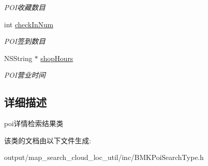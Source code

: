 \begin{DoxyCompactItemize}
\begin{DoxyCompactList}\small\item\em P\+O\+I收藏数目 \end{DoxyCompactList}\item 
\hypertarget{interface_b_m_k_poi_detail_result_aeb7c140cbab374cb4a1171d9b0110e47}{int \hyperlink{interface_b_m_k_poi_detail_result_aeb7c140cbab374cb4a1171d9b0110e47}{check\+In\+Num}}\label{interface_b_m_k_poi_detail_result_aeb7c140cbab374cb4a1171d9b0110e47}

\begin{DoxyCompactList}\small\item\em P\+O\+I签到数目 \end{DoxyCompactList}\item 
\hypertarget{interface_b_m_k_poi_detail_result_abc1d7ae185ffba432cf72148c9a896dd}{N\+S\+String $\ast$ \hyperlink{interface_b_m_k_poi_detail_result_abc1d7ae185ffba432cf72148c9a896dd}{shop\+Hours}}\label{interface_b_m_k_poi_detail_result_abc1d7ae185ffba432cf72148c9a896dd}

\begin{DoxyCompactList}\small\item\em P\+O\+I营业时间 \end{DoxyCompactList}\end{DoxyCompactItemize}


\subsection{详细描述}
poi详情检索结果类 

该类的文档由以下文件生成\+:\begin{DoxyCompactItemize}
\item 
output/map\+\_\+search\+\_\+cloud\+\_\+loc\+\_\+util/inc/B\+M\+K\+Poi\+Search\+Type.\+h\end{DoxyCompactItemize}
